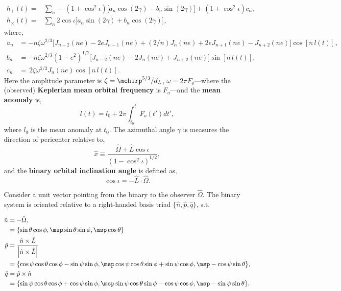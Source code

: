 \documentclass[10pt, oneside, onecolumn]{article}   	%
\begin{document}
    \begin{align}
    \label{eq:}
    h_{+}(t) = & \sum_n - (1 + \cos^2 \iota) \Big[ a_n \cos(2\gamma) - b_n \sin(2\gamma)\Big] + (1+\cos^2 \iota) c_n, \nonumber \\
    h_{\times}(t) = & \sum_n 2\cos \iota \Big[a_n \sin(2\gamma) + b_n \cos(2\gamma)\Big],
    \end{align}
    where,
    \begin{align}
    \label{eq:}
    a_n & = -n\zeta \omega^{2/3}\bigg[J_{n-2}(ne) - 2eJ_{n-1}(ne) + (2/n)J_n(ne) + 2 e J_{n+1}(ne) - J_{n+2}(ne)\bigg]\cos\left[n \, l(t)\right], \nonumber \\
    b_n & = -n\zeta \omega^{2/3} (1 - e^2)^{1/2}\bigg[J_{n-2}(ne) - 2J_n (ne) + J_{n+2}(ne)\bigg]\sin\left[n \, l(t)\right], \\
    c_n & = \, 2 \zeta \omega^{2/3} J_n (ne)\cos\left[n \, l (t)\right]. \nonumber
    \end{align}
    Here the amplitude parameter is $\zeta = \mchirp^{5/3} / d_L$, $\omega = 2 \pi F_o$---where the (observed) \textbf{Keplerian mean orbital frequency} is $F_o$---and the \textbf{mean anomaly} is,
    \begin{equation}
    l(t) = l_0 + 2\pi \int_{t_0}^{t} F_o(t') dt',
    \end{equation}
    where $l_0$ is the mean anomaly at $t_0$.  The azimuthal angle $\gamma$ is measures the direction of pericenter relative to,
    \begin{equation}
    \hat{x} \equiv \frac{\hat{\Omega} + \hat{L} \cos \iota}{\left(1 - \cos^2 \iota\right)^{1/2}},
    \end{equation}
    and the \textbf{binary orbital inclination angle} is defined as,
    \begin{equation}
    \cos \iota = - \hat{L} \cdot \hat{\Omega}.
    \end{equation}

    Consider a unit vector pointing from the binary to the observer $\hat{\Omega}$.  The binary system is oriented relative to a right-handed basis triad $\{\hat{n}, \hat{p}, \hat{q}\}$, s.t.

    \begin{align}
    \hat{n} & = - \hat{\Omega}, \nonumber \\
    & = \{\sin \theta \cos \phi,\msp  \sin\theta \sin \phi, \msp \cos\theta  \} \nonumber \\
    \hat{p} & = \frac{\hat{n} \times \hat{L}}{\left| \hat{n} \times \hat{L}\right|} \\
    & = \{\cos\psi\cos\theta\cos\phi - \sin\psi\sin\phi , \msp
    \cos\psi\cos\theta\sin\phi + \sin\psi\cos\phi, \msp
    -\cos\psi\sin\theta\}, \nonumber \\
    \hat{q} & = \hat{p} \times \hat{n} \nonumber \\
    & = \{\sin\psi \cos\theta \cos\phi + \cos\psi \sin\phi,
    \msp \sin\psi \cos\theta \sin\phi - \cos\psi \cos\phi,
    \msp -\sin\psi \sin\theta \}. \nonumber
    \end{align}
\end{document}
